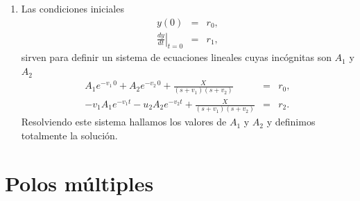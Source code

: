 \begin{enumerate}
\item Las condiciones iniciales 
\begin{eqnarray}
        y(0)                                    &=& r_{0},                                      \\
        \left. \frac{dy}{dt} \right|_{t = 0}    &=& r_{1},      
\end{eqnarray}
sirven para definir un sistema de ecuaciones lineales cuyas inc\'{o}gnitas son $A_{1}$ y $A_{2}$
\begin{eqnarray}
  A_{1} e^{-v_{1} \, 0} + A_{2} e^{-v_{2} \, 0} + \frac{X}{(s + v_{1})(s + v_{2})}  &=& r_{0},   \\
  -v_{1} A_{1} e^{-v_{1} t} -u_{2} A_{2} e^{-v_{2} t} + \frac{X}{(s + v_{1})(s + v_{2})} &=& 
    r_{2}.
\end{eqnarray}
Resolviendo este sistema hallamos los valores de $A_{1}$ y $A_{2}$ y definimos totalmente la soluci\'{o}n.

\end{enumerate}

\section{Polos m\'{u}ltiples}

